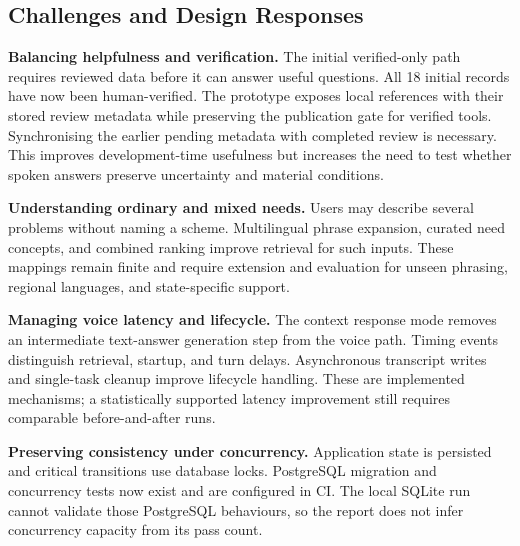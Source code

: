 \documentclass[11pt,a4paper,oneside]{report}
\begin{document}
\subsection{Challenges and Design Responses}
\textbf{Balancing helpfulness and verification.}
The initial verified-only path requires reviewed data before it can answer useful
questions. All 18 initial records have now been human-verified. The prototype
exposes local references with their stored review metadata while preserving the
publication gate for verified tools. Synchronising the earlier pending metadata
with completed review is necessary. This improves
development-time usefulness but increases the need to test whether spoken answers
preserve uncertainty and material conditions.

\textbf{Understanding ordinary and mixed needs.}
Users may describe several problems without naming a scheme. Multilingual phrase
expansion, curated need concepts, and combined ranking improve retrieval for such
inputs. These mappings remain finite and require extension and evaluation for
unseen phrasing, regional languages, and state-specific support.

\textbf{Managing voice latency and lifecycle.}
The context response mode removes an intermediate text-answer generation step
from the voice path. Timing events distinguish retrieval, startup, and turn delays.
Asynchronous transcript writes and single-task cleanup improve lifecycle handling.
These are implemented mechanisms; a statistically supported latency improvement
still requires comparable before-and-after runs.

\textbf{Preserving consistency under concurrency.}
Application state is persisted and critical transitions use database locks.
PostgreSQL migration and concurrency tests now exist and are configured in CI.
The local SQLite run cannot validate those PostgreSQL behaviours, so the report
does not infer concurrency capacity from its pass count.
\end{document}
